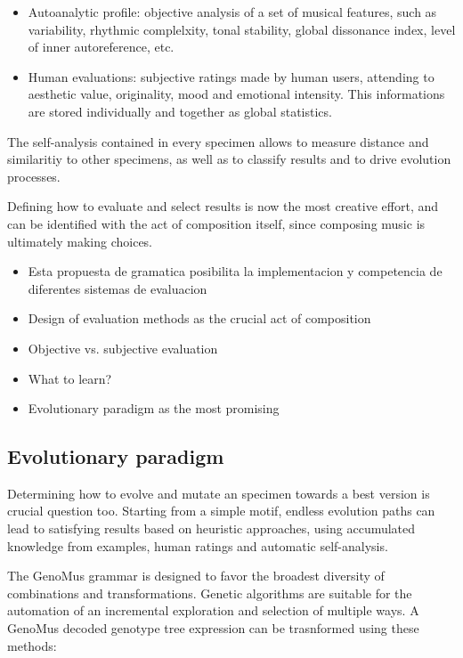 \documentclass{article}
\begin{document}
\begin{itemize}
\item Autoanalytic profile: objective analysis of a set of musical features, such as variability, rhythmic complelxity, tonal stability, global dissonance index, level of inner autoreference, etc. 
\item Human evaluations: subjective ratings made by human users, attending to aesthetic value, originality, mood and emotional intensity. This informations are stored individually and together as global statistics.

\end{itemize}

The self-analysis contained in every specimen allows to measure distance and similaritiy to  
other specimens, as well as to classify results and to drive evolution processes.

Defining how to evaluate and select results is now the most creative effort, and can be identified with the act of composition itself, since composing music is ultimately making choices. 


{\color{red}


\begin{itemize}
\item Esta propuesta de gramatica posibilita la implementacion y competencia de diferentes sistemas de evaluacion
\item Design of evaluation methods as the crucial act of composition
\item Objective vs. subjective evaluation
\item What to learn?
\item Evolutionary paradigm as the most promising
\end{itemize}


}


\subsection{Evolutionary paradigm}

Determining how to evolve and mutate an specimen towards a best version is crucial question too. Starting from a simple motif, endless evolution paths can lead to satisfying results based on heuristic approaches, using accumulated knowledge from examples, human ratings and automatic self-analysis.

The GenoMus grammar is designed to favor the broadest diversity of combinations and transformations. Genetic algorithms are suitable for the automation of an incremental exploration and selection of multiple ways. A GenoMus decoded genotype tree expression can be trasnformed using these methods:
\end{document}
